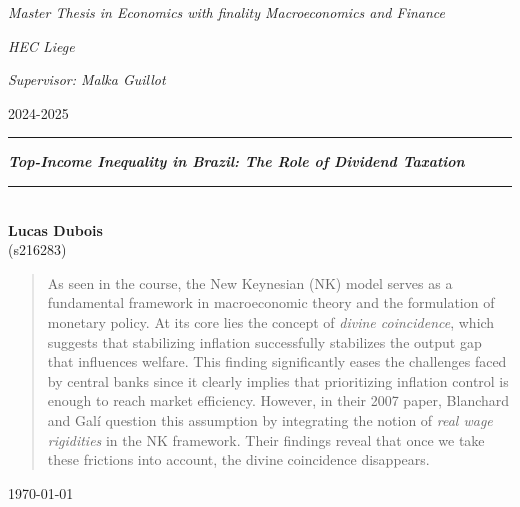 \documentclass[a4paper, 12pt]{article}
\begin{document}
\pagestyle{fancy}
\fancyhf{}
\rhead{\today}
\cfoot{\thepage}
\renewcommand{\headrulewidth}{0pt}
\begin{titlepage}
\vspace{12cm}
\par
\textit{Master Thesis in Economics with finality Macroeconomics and Finance}
\par
\textit{HEC Liege}
\par
\textit{Supervisor: Malka Guillot}
\par
2024-2025
\begin{center}
\rule{\linewidth}{1pt}
\vspace{0,5cm}
\vspace{0.75cm}
\begin{spacing}{1.75}
{\LARGE \textbf{\textit{Top-Income Inequality in Brazil: The Role of Dividend Taxation}}}
\vspace{0.75cm}
\end{spacing}
\rule{\linewidth}{1pt}
\vspace{0,5cm}
\\
\textbf{{\large Lucas Dubois}}
\\
\vspace{0,5cm}
{(s216283)}\end{center}
\vspace{0.5cm}
\begin{abstract}
    \hspace{1cm} As seen in the course, the New Keynesian (NK) model serves as a fundamental framework in macroeconomic theory and the formulation of monetary policy. 
At its core lies the concept of \textit{divine coincidence}, which suggests that stabilizing inflation successfully stabilizes the output gap that influences welfare. 
This finding significantly eases the challenges faced by central banks since it clearly implies that prioritizing inflation control is enough to reach market efficiency.
However, in their 2007 paper, Blanchard and Galí question this assumption by integrating the notion of \textit{real wage rigidities } in the NK framework. 
Their findings reveal that once we take these frictions into account, the divine coincidence disappears.
\end{abstract}

\vspace{3cm}

\begin{center}
{\Large \today}
\end{center}
\end{titlepage}
\tableofcontents
\newpage
\end{document}
